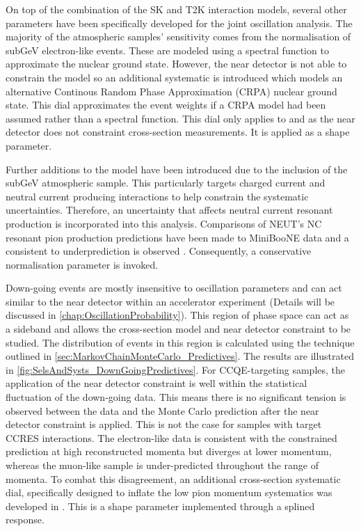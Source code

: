 
On top of the combination of the SK and T2K interaction models, several other parameters have been specifically developed for the joint oscillation analysis. The majority of the atmospheric samples'  sensitivity comes from the normalisation of subGeV electron-like events. These are modeled using a spectral function to approximate the nuclear ground state. However, the near detector is not able to constrain the model so an additional systematic is introduced which models an alternative Continous Random Phase Approximation (CRPA) nuclear ground state. This dial approximates the event weights if a CRPA model had been assumed rather than a spectral function. This dial only applies to  and  as the near detector does not constraint  cross-section measurements. It is applied as a shape parameter.

Further additions to the model have been introduced due to the inclusion of the subGeV  atmospheric sample. This particularly targets charged current and neutral current  producing interactions to help constrain the systematic uncertainties. Therefore, an uncertainty that affects neutral current resonant  production is incorporated into this analysis. Comparisons of NEUT's NC resonant pion production predictions have been made to MiniBooNE \cite{MB_NC1pi0} data and a consistent  to  underprediction is observed \cite{t2k_tn_422}. Consequently, a conservative  normalisation parameter is invoked. 

Down-going events are mostly insensitive to oscillation parameters and can act similar to the near detector within an accelerator experiment (Details will be discussed in \autoref{chap:OscillationProbability}). This region of phase space can act as a sideband and allows the cross-section model and near detector constraint to be studied. The distribution of events in this region is calculated using the technique outlined in \autoref{sec:MarkovChainMonteCarlo_Predictives}. The results are illustrated in \autoref{fig:SelsAndSysts_DownGoingPredictives}. For CCQE-targeting samples, the application of the near detector constraint is well within the statistical fluctuation of the down-going data. This means there is no significant tension is observed between the data and the Monte Carlo prediction after the near detector constraint is applied. This is not the case for samples with target CCRES interactions. The electron-like data is consistent with the constrained prediction at high reconstructed momenta but diverges at lower momentum, whereas the muon-like sample is under-predicted throughout the range of momenta. To combat this disagreement, an additional cross-section systematic dial, specifically designed to inflate the low pion momentum systematics was developed in \cite{t2k_tn_422}. This is a shape parameter implemented through a splined response. 

